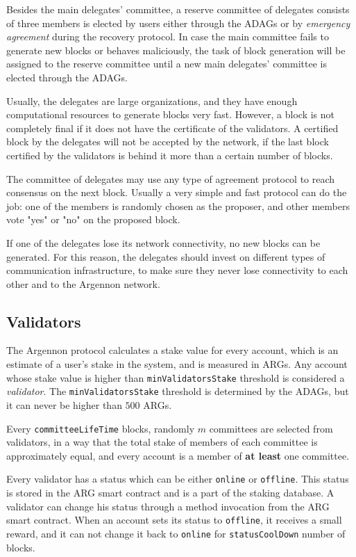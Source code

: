 Besides the main delegates' committee, a reserve committee of delegates consists of three members is elected by users
either through the ADAGs or by \emph{emergency agreement} during the recovery protocol. In case the main committee
fails to generate new blocks or behaves maliciously, the task of
block generation will be assigned to the reserve committee until a new main delegates' committee is elected
through the ADAGs.

Usually, the delegates are large organizations, and they have enough computational resources to generate blocks
very fast. However, a block is not completely final if it does not have the certificate of the validators.
A certified block by the delegates will not be accepted by the network, if the last block certified by
the validators is behind it more than a certain number of blocks.

The committee of delegates may use any type of agreement protocol to reach consensus on the
next block. Usually a very simple and fast protocol can do the job: one of the members
is randomly chosen as the proposer, and other members vote "yes" or "no" on the proposed block.

If one of the delegates lose its network connectivity, no new blocks can be generated. For this reason,
the delegates should invest on different types of communication infrastructure, to make sure they never lose
connectivity to each other and to the Argennon network.

\subsection{Validators}\label{subsec:validators-committee}

The Argennon protocol calculates a stake value for every account, which is an estimate of a user's stake in the
system, and is measured in ARGs. Any account whose stake value is higher than
\texttt{minValidatorsStake} threshold is considered a \emph{validator}.
The \texttt{minValidatorsStake}
threshold is determined by the ADAGs, but it can never be higher than $500$ ARGs.

Every \texttt{committeeLifeTime} blocks, randomly $m$ committees are selected from
validators, in a way that the total stake of members of each committee is approximately equal, and every
account is a member of \textbf{at least} one committee.

Every validator has a status which can be either \texttt{online} or \texttt{offline}.
This status is stored in the ARG smart contract and is a part of the staking database. A validator can change
his status through a method invocation
from the ARG smart contract. When an account sets its status to \texttt{offline}, it receives a small reward, and
it can not change it back to \texttt{online} for \texttt{statusCoolDown} number of blocks.

